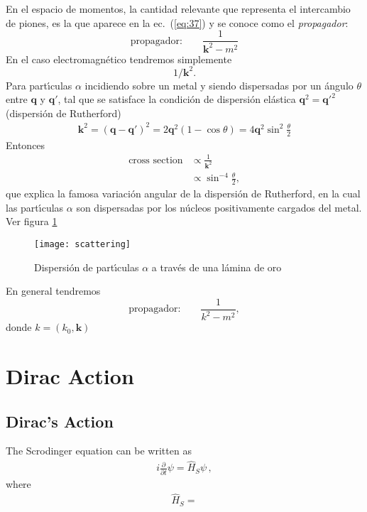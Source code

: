 En el espacio de momentos, la cantidad relevante que representa el
intercambio de piones, es la que aparece en la ec.~(\ref{eq:37}) y se
conoce como el \emph{propagador}:
\begin{equation}
\text{propagador:}\qquad \frac{1}{\mathbf{k}^2-m^2}
\end{equation}
En el caso electromagn\'etico tendremos simplemente
\begin{equation}
  1/\mathbf{k}^2.
\end{equation}
Para part\'\i culas $\alpha$ incidiendo sobre un metal y siendo dispersadas por un \'angulo $\theta$ entre $\mathbf{q}$ y $\mathbf{q}'$, tal que se satisface la condici\'on de dispersi\'on el\'astica $\mathbf{q}^2={\mathbf{q}'}^2$ (dispersi\'on de Rutherford)
\begin{align}
  \mathbf{k}^2=(\mathbf{q}-\mathbf{q}')^2=2\mathbf{q}^2(1-\cos\theta)=4\mathbf{q}^2\sin^2\frac{\theta}{2}
\end{align}
Entonces
\begin{align}
  \text{cross section}&\propto\frac{1}{\mathbf{k}^2}\nonumber\\
  &\propto\sin^{-4}\frac{\theta}{2},
\end{align}
que explica la famosa variaci\'on angular de la dispersi\'on de Rutherford, en la cual las part\'\i culas $\alpha$ son dispersadas por los n\'ucleos positivamente cargados del metal. Ver figura \ref{fig:sr}

\begin{figure} %
\texttt{[image: scattering]} %
  \caption{Dispersi\'on de part\'\i culas $\alpha$ a trav\'es de una l\'amina de oro} %
  \label{fig:sr} %
\end{figure} %

 
En general tendremos
\begin{equation}
\text{propagador:}\qquad \frac{1}{k^2-m^2},
\end{equation}
donde $k=(k_0,\mathbf{k})$




\chapter{Dirac Action}
\label{cha:dirac-action}


\section{Dirac's Action}
\label{sec:dirac-equation}
The Scrodinger equation can be written as
\begin{align}
    i\frac{\partial}{\partial t}\psi=\hat{H}_{S} \psi\,,  
\end{align}
where
\begin{align}
  \hat{H}_{S}=
\end{align}


